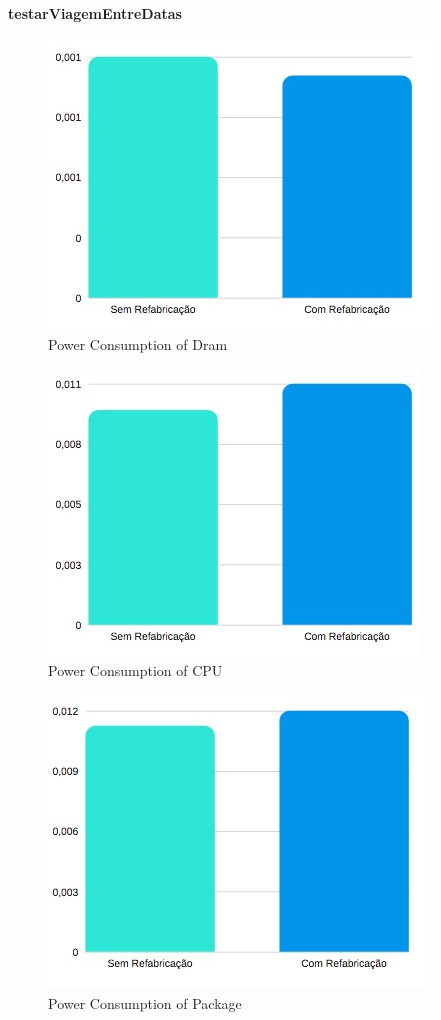 \textbf{testarViagemEntreDatas}

\begin{figure}[H]
    \centering
    \includegraphics[scale=0.8]{tex/img/graficos/15.jpg}
    \caption{Power Consumption of Dram}
\end{figure}

\begin{figure}[H]
    \centering
    \includegraphics[scale=0.8]{tex/img/graficos/16.jpg}
    \caption{Power Consumption of CPU}
\end{figure}

\begin{figure}[H]
    \centering
    \includegraphics[scale=0.8]{tex/img/graficos/17.jpg}
    \caption{Power Consumption of Package}
\end{figure}

